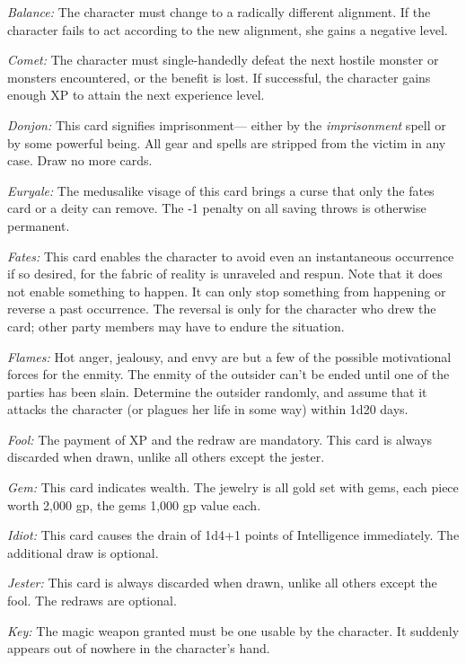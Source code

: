 \vspace{12pt}
\textit{Balance: }The character must change to a radically different alignment. 
If the character fails to act according to the new alignment, she gains a negative 
level.

\textit{Comet: }The character must single-handedly defeat the next hostile monster 
or monsters encountered, or the benefit is lost. If successful, the character gains 
enough XP to attain the next experience level.

\textit{Donjon: }This card signifies imprisonment--- either by the \textit{imprisonment 
}spell or by some powerful being. All gear and spells are stripped from the victim 
in any case. Draw no more cards.

\textit{Euryale: }The medusalike visage of this card brings a curse that only the 
fates card or a deity can remove. The -1 penalty on all saving throws is otherwise 
permanent.

\textit{Fates: }This card enables the character to avoid even an instantaneous 
occurrence if so desired, for the fabric of reality is unraveled and respun. Note 
that it does not enable something to happen. It can only stop something from happening 
or reverse a past occurrence. The reversal is only for the character who drew the 
card; other party members may have to endure the situation.

\textit{Flames: }Hot anger, jealousy, and envy are but a few of the possible motivational 
forces for the enmity. The enmity of the outsider can't be ended until one of the 
parties has been slain. Determine the outsider randomly, and assume that it attacks 
the character (or plagues her life in some way) within 1d20 days.

\textit{Fool: }The payment of XP and the redraw are mandatory. This card is always 
discarded when drawn, unlike all others except the jester.

\textit{Gem: }This card indicates wealth. The jewelry is all gold set with gems, 
each piece worth 2,000 gp, the gems 1,000 gp value each. 

\textit{Idiot: }This card causes the drain of 1d4+1 points of Intelligence immediately. 
The additional draw is optional.

\textit{Jester: }This card is always discarded when drawn, unlike all others except 
the fool. The redraws are optional.

\textit{Key: }The magic weapon granted must be one usable by the character. It 
suddenly appears out of nowhere in the character's hand.


